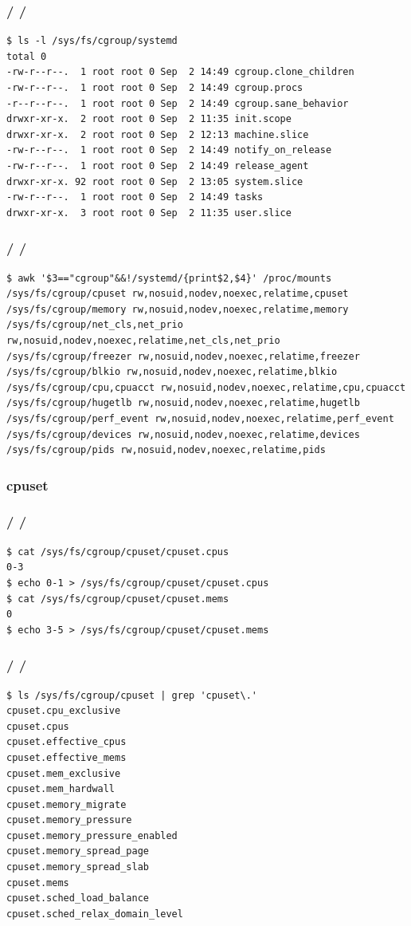 \documentclass{beamer}
\newcommand{\autotitle}
{\frametitle{
    \secname
    \ifx\insertsubsection\empty
    \else
        /\subsecname
        \ifx\insertsubsubsection\empty\else/\subsubsecname\fi
    \fi}}
\begin{document}
\begin{frame}[fragile]
    \autotitle
    \begin{verbatim}
$ ls -l /sys/fs/cgroup/systemd
total 0
-rw-r--r--.  1 root root 0 Sep  2 14:49 cgroup.clone_children
-rw-r--r--.  1 root root 0 Sep  2 14:49 cgroup.procs
-r--r--r--.  1 root root 0 Sep  2 14:49 cgroup.sane_behavior
drwxr-xr-x.  2 root root 0 Sep  2 11:35 init.scope
drwxr-xr-x.  2 root root 0 Sep  2 12:13 machine.slice
-rw-r--r--.  1 root root 0 Sep  2 14:49 notify_on_release
-rw-r--r--.  1 root root 0 Sep  2 14:49 release_agent
drwxr-xr-x. 92 root root 0 Sep  2 13:05 system.slice
-rw-r--r--.  1 root root 0 Sep  2 14:49 tasks
drwxr-xr-x.  3 root root 0 Sep  2 11:35 user.slice
    \end{verbatim}
\end{frame}

\begin{frame}[fragile]
    \autotitle
    \scriptsize
    \begin{verbatim}
$ awk '$3=="cgroup"&&!/systemd/{print$2,$4}' /proc/mounts
/sys/fs/cgroup/cpuset rw,nosuid,nodev,noexec,relatime,cpuset
/sys/fs/cgroup/memory rw,nosuid,nodev,noexec,relatime,memory
/sys/fs/cgroup/net_cls,net_prio rw,nosuid,nodev,noexec,relatime,net_cls,net_prio
/sys/fs/cgroup/freezer rw,nosuid,nodev,noexec,relatime,freezer
/sys/fs/cgroup/blkio rw,nosuid,nodev,noexec,relatime,blkio
/sys/fs/cgroup/cpu,cpuacct rw,nosuid,nodev,noexec,relatime,cpu,cpuacct
/sys/fs/cgroup/hugetlb rw,nosuid,nodev,noexec,relatime,hugetlb
/sys/fs/cgroup/perf_event rw,nosuid,nodev,noexec,relatime,perf_event
/sys/fs/cgroup/devices rw,nosuid,nodev,noexec,relatime,devices
/sys/fs/cgroup/pids rw,nosuid,nodev,noexec,relatime,pids
    \end{verbatim}
\end{frame}

\subsubsection{cpuset}

\begin{frame}[fragile]
    \autotitle
    \begin{verbatim}
$ cat /sys/fs/cgroup/cpuset/cpuset.cpus
0-3
$ echo 0-1 > /sys/fs/cgroup/cpuset/cpuset.cpus
$ cat /sys/fs/cgroup/cpuset/cpuset.mems
0
$ echo 3-5 > /sys/fs/cgroup/cpuset/cpuset.mems
    \end{verbatim}
\end{frame}

\begin{frame}[fragile]
    \autotitle
    \begin{verbatim}
$ ls /sys/fs/cgroup/cpuset | grep 'cpuset\.'
cpuset.cpu_exclusive
cpuset.cpus
cpuset.effective_cpus
cpuset.effective_mems
cpuset.mem_exclusive
cpuset.mem_hardwall
cpuset.memory_migrate
cpuset.memory_pressure
cpuset.memory_pressure_enabled
cpuset.memory_spread_page
cpuset.memory_spread_slab
cpuset.mems
cpuset.sched_load_balance
cpuset.sched_relax_domain_level
    \end{verbatim}
\end{frame}
\end{document}
